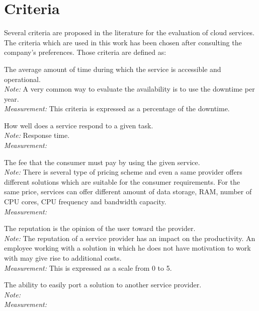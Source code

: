\documentclass[a4paper,11pt]{article}
\begin{document}
\section{Criteria}
Several criteria are proposed in the literature for the evaluation of cloud services. The criteria which are used in this work has been chosen after consulting the company's preferences.
Those criteria are defined as:
\begin{description}[parsep=1pt,listparindent=\parindent,labelindent=\parindent,font=$\bullet$\ ]
  \item[Availability:] The average amount of time during which the service is accessible and operational.\\
    \emph{Note:} A very common way to evaluate the availability is to use the downtime per year.\\
    \emph{Measurement:} This criteria is expressed as a percentage of the downtime.

  \item[Efficiency:] How well does a service respond to a given task.\\
    \emph{Note:} Response time.\\
    \emph{Measurement:} 

  
  \item[Cost:] The fee that the consumer must pay by using the given service.\\
    \emph{Note:} There is several type of pricing scheme and even a same provider offers different solutions which are suitable for the consumer requirements. For the same price, services can offer different amount of data storage, RAM, number of CPU cores, CPU frequency and bandwidth capacity.\\
    \emph{Measurement:} 

  \item[Reputation:] The reputation is the opinion of the user toward the provider.\\
    \emph{Note:} The reputation of a service provider has an impact on the productivity. An employee working with a solution in which he does not have motivation to work with may give rise to additional costs.\\
    \emph{Measurement:} This is expressed as a scale from 0 to 5.
    
  \item[Portability:] The ability to easily port a solution to another service provider.\\%
    \emph{Note:} \\
    \emph{Measurement:} 


\end{description}
\end{document}

